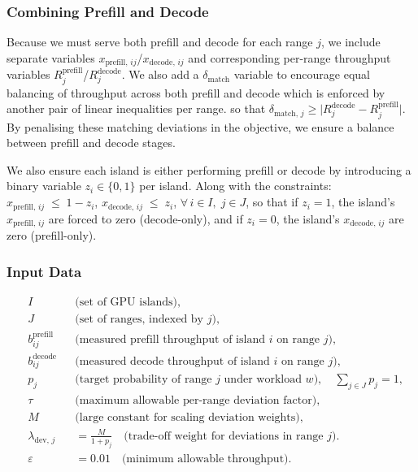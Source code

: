 \subsubsection{Combining Prefill and Decode}
Because we must serve both prefill and decode for each range \(j\), we include separate variables \(x_{\mathrm{prefill},\,ij}\)/\(x_{\mathrm{decode},\,ij}\) and corresponding per-range throughput variables \(R_{j}^{\mathrm{prefill}}\)/\(R_{j}^{\mathrm{decode}}\).
We also add a \(\delta_{\mathrm{match}}\) variable to encourage equal balancing of throughput across both prefill and decode which is enforced by another pair of linear inequalities per range.
so that \(\delta_{\mathrm{match},\,j} \ge \lvert R_{j}^{\mathrm{decode}} - R_{j}^{\mathrm{prefill}}\rvert\).
By penalising these matching deviations in the objective, we ensure a balance between prefill and decode stages.

We also ensure each island is either performing prefill or decode by introducing a binary variable \(z_i\in\{0,1\}\) per island.
Along with the constraints: \(x_{\mathrm{prefill},\,i j} \;\le\; 1 - z_i\), \(x_{\mathrm{decode},\,i j} \;\le\; z_i\),  \(\forall\,i\in I,\;j\in J\), so that if \(z_i=1\), the island's \(x_{\mathrm{prefill},\,ij}\) are forced to zero (decode-only), and if \(z_i=0\), the island's \(x_{\mathrm{decode},\,ij}\) are zero (prefill-only).


\subsubsection*{Input Data}
\[
\begin{aligned}
& I &&\text{(set of GPU islands)},\\
& J &&\text{(set of ranges, indexed by }j\text{)},\\
& b^{\mathrm{prefill}}_{i j} &&\text{(measured prefill throughput of island }i\text{ on range }j\text{)},\\
& b^{\mathrm{decode}}_{i j} &&\text{(measured decode throughput of island }i\text{ on range }j\text{)},\\
& p_j &&\text{(target probability of range }j\text{ under workload }w),\quad \sum_{j\in J} p_j = 1,\\
& \tau &&\text{(maximum allowable per-range deviation factor)},\\
& M &&\text{(large constant for scaling deviation weights)},\\
& \lambda_{\mathrm{dev},\,j} &&= \frac{M}{1 + p_j}\quad\text{(trade-off weight for deviations in range }j\text{).}\\
& \varepsilon &&= 0.01 \quad\text{(minimum allowable throughput)}.
\end{aligned}
\]

